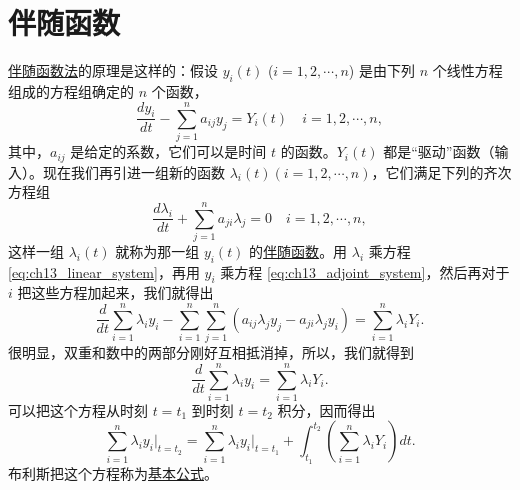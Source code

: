 \section{伴随函数}

\underline{伴随函数法}的原理是这样的：假设 $y_i(t)$ ($i=1, 2, \cdots, n$) 是由下列 $n$ 个线性方程组成的方程组确定的 $n$ 个函数，
\begin{equation}\label{eq:ch13_linear_system}
\frac{dy_i}{dt} - \sum_{j=1}^n a_{ij} y_j = Y_i(t) \quad i=1, 2, \cdots, n,
\end{equation}
其中，$a_{ij}$ 是给定的系数，它们可以是时间 $t$ 的函数。$Y_i(t)$ 都是“驱动”函数（输入）。现在我们再引进一组新的函数 $\lambda_i(t) (i=1,2,\cdots,n)$，它们满足下列的齐次方程组
\begin{equation}\label{eq:ch13_adjoint_system}
\frac{d\lambda_i}{dt} + \sum_{j=1}^n a_{ji}\lambda_j = 0 \quad i=1,2,\cdots,n,
\end{equation}
这样一组 $\lambda_i(t)$ 就称为那一组 $y_i(t)$ 的\underline{伴随函数}。用 $\lambda_i$ 乘方程 \eqref{eq:ch13_linear_system}，再用 $y_i$ 乘方程 \eqref{eq:ch13_adjoint_system}，然后再对于 $i$ 把这些方程加起来，我们就得出
\begin{equation*}
\frac{d}{dt} \sum_{i=1}^n \lambda_i y_i - \sum_{i=1}^n \sum_{j=1}^n (a_{ij} \lambda_j y_j - a_{ji} \lambda_j y_i) = \sum_{i=1}^n \lambda_i Y_i.
\end{equation*}
很明显，双重和数中的两部分刚好互相抵消掉，所以，我们就得到
\begin{equation}\label{eq:ch13_basic_formula_deriv}
\frac{d}{dt} \sum_{i=1}^n \lambda_i y_i = \sum_{i=1}^n \lambda_i Y_i.
\end{equation}
可以把这个方程从时刻 $t=t_1$ 到时刻 $t=t_2$ 积分，因而得出
\begin{equation}\label{eq:ch13_basic_formula}
\sum_{i=1}^n \lambda_i y_i \bigg|_{t=t_2} = \sum_{i=1}^n \lambda_i y_i \bigg|_{t=t_1} + \int_{t_1}^{t_2} \left( \sum_{i=1}^n \lambda_i Y_i \right) dt.
\end{equation}
布利斯把这个方程称为\underline{基本公式}。


